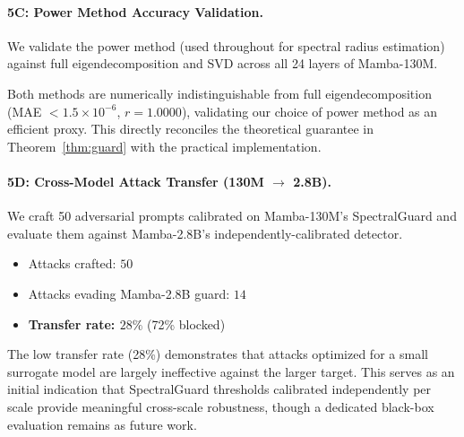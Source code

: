 \documentclass[10pt,twocolumn]{article}
\begin{document}
\paragraph{5C: Power Method Accuracy Validation.}
We validate the power method (used throughout for spectral radius estimation)
against full eigendecomposition and SVD across all 24 layers of Mamba-130M.

\begin{table}[ht]
\centering
\caption{Power Method vs. Full Eigendecomposition.}
\end{table}

\noindent Both methods are numerically indistinguishable from full
eigendecomposition (MAE $< 1.5 {\times} 10^{-6}$, $r{=}1.0000$), validating
our choice of power method as an efficient proxy. This directly reconciles
the theoretical guarantee in Theorem~\ref{thm:guard} with the practical
implementation.

\paragraph{5D: Cross-Model Attack Transfer (130M $\to$ 2.8B).}
We craft 50 adversarial prompts calibrated on Mamba-130M's SpectralGuard
and evaluate them against Mamba-2.8B's independently-calibrated detector.

\begin{itemize}
\item Attacks crafted: $50$
\item Attacks evading Mamba-2.8B guard: $14$
\item \textbf{Transfer rate: $28\%$} \quad (72\% blocked)
\end{itemize}

\noindent The low transfer rate (28\%) demonstrates that attacks optimized
for a small surrogate model are largely ineffective against the larger target.
This serves as an initial indication that SpectralGuard thresholds calibrated
independently per scale provide meaningful cross-scale robustness, though a
dedicated black-box evaluation remains as future work.
\end{document}
